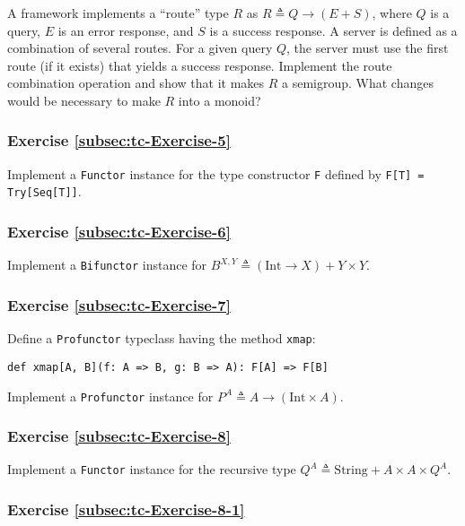 A framework implements a \textsf{``}route\textsf{''} type $R$ as $R\triangleq Q\rightarrow(E+S)$,
where $Q$ is a query, $E$ is an error response, and $S$ is a success
response. A server is defined as a combination of several routes.
For a given query $Q$, the server must use the first route (if it
exists) that yields a success response. Implement the route combination
operation and show that it makes $R$ a semigroup. What changes would
be necessary to make $R$ into a monoid?

\subsubsection{Exercise \label{subsec:tc-Exercise-5}\ref{subsec:tc-Exercise-5}}

Implement a \lstinline!Functor! instance for the type constructor
\lstinline!F! defined by \lstinline!F[T] = Try[Seq[T]]!.

\subsubsection{Exercise \label{subsec:tc-Exercise-6}\ref{subsec:tc-Exercise-6}}

Implement a \lstinline!Bifunctor! instance for $B^{X,Y}\triangleq\left(\text{Int}\rightarrow X\right)+Y\times Y$.

\subsubsection{Exercise \label{subsec:tc-Exercise-7}\ref{subsec:tc-Exercise-7}}

Define a \lstinline!Profunctor! typeclass having the method \lstinline!xmap!:

\begin{lstlisting}
def xmap[A, B](f: A => B, g: B => A): F[A] => F[B]
\end{lstlisting}
Implement a \lstinline!Profunctor! instance for $P^{A}\triangleq A\rightarrow\left(\text{Int}\times A\right)$.

\subsubsection{Exercise \label{subsec:tc-Exercise-8}\ref{subsec:tc-Exercise-8}}

Implement a \lstinline!Functor! instance for the recursive type $Q^{A}\triangleq\text{String}+A\times A\times Q^{A}$.

\subsubsection{Exercise \label{subsec:tc-Exercise-8-1}\ref{subsec:tc-Exercise-8-1}}

